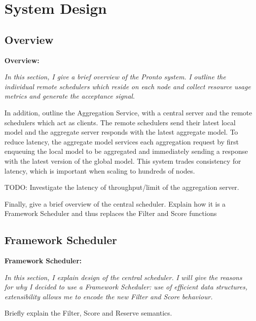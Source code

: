 \section{System Design}
\subsection{Overview}
\begin{tcolorbox}[boxsep=0mm,left=2.5mm,right=2.5mm]
    \textbf{Overview:} {\em In this section, I give a brief overview of the
    Pronto system. I outline the individual remote schedulers which reside on
    each node and collect resource usage metrics and generate the acceptance
    signal.

    In addition, outline the Aggregation Service, with a central server and the
    remote schedulers which act as clients. The remote schedulers send their
    latest local model and the aggregate server responds with the latest
    aggregate model. To reduce latency, the aggregate model services each
    aggregation request by first enqueuing the local model to be aggregated and
    immediately sending a response with the latest version of the global model.
    This system trades consistency for latency, which is important when scaling
    to hundreds of nodes.

    TODO: Investigate the latency of throughput/limit of the aggregation server.

    Finally, give a brief overview of the central scheduler. Explain how it is a
    Framework Scheduler and thus replaces the Filter and Score functions}
\end{tcolorbox}

\subsection{Framework Scheduler}
\begin{tcolorbox}[boxsep=0mm,left=2.5mm,right=2.5mm]
    \textbf{Framework Scheduler:} {\em In this section, I explain design of the central
    scheduler. I will give the reasons for why I decided to use a Framework
    Scheduler: use of efficient data structures, extensibility allows me to
    encode the new Filter and Score behaviour.

    Briefly explain the Filter, Score and Reserve semantics.
    }
\end{tcolorbox}
